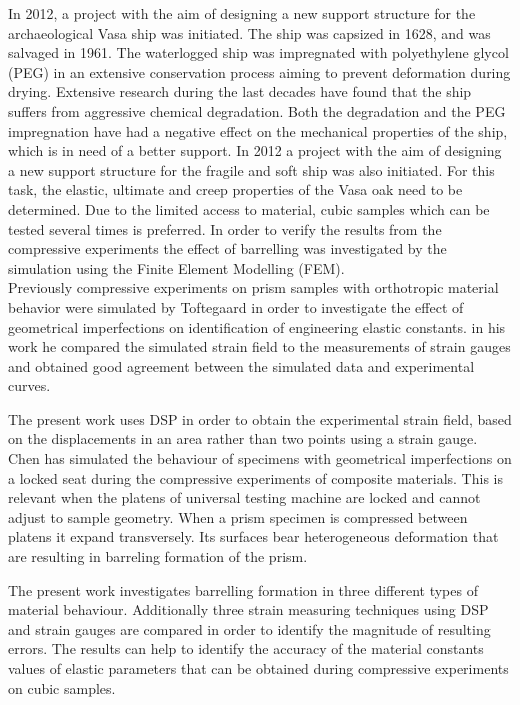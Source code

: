 \documentclass[review]{elsarticle}
\begin{document}
In 2012, a project with the aim of designing a new support structure for the
archaeological Vasa ship was initiated. The ship was capsized in 1628, and was salvaged in 1961. 
The waterlogged ship was impregnated with polyethylene glycol (PEG) in an extensive conservation process aiming to prevent deformation during drying. 
Extensive research during the last decades have found that the ship suffers from
aggressive chemical degradation. Both the degradation \cite{bjurhager2012state}
and the PEG impregnation \cite{ljungdahl2007transverse} have had a negative effect on the mechanical properties of the ship, which is in need of a better support. In 2012 a project with the aim of 
designing a new support structure for the fragile and soft ship was also initiated. For this task, the elastic, ultimate and creep properties of the 
Vasa oak need to be determined. Due to the limited access to material, cubic samples which can be tested several times is preferred.
In order to verify the results from the compressive experiments the effect of
barrelling was investigated by the simulation using the Finite Element
Modelling (FEM).\\
Previously compressive experiments on prism samples with orthotropic material
behavior were simulated by Toftegaard \cite{Toftegaard1999849} in order to
investigate the effect of geometrical imperfections on identification of
engineering elastic constants.
in his work he compared the simulated strain field to the measurements of strain
gauges and obtained good agreement between the simulated data and experimental
curves.\par
The present work uses DSP in order to obtain the experimental strain field,
based on the displacements in an area rather than two points using a strain
gauge.
Chen \cite{Chen001} has simulated the behaviour of specimens with geometrical
imperfections on a locked  seat during the compressive experiments
of composite materials. This is relevant when the platens of universal testing
machine are locked and cannot adjust to sample geometry.
When a prism specimen is compressed between platens it expand transversely.
Its surfaces bear heterogeneous deformation that are resulting in barreling
formation of the prism.\par 




The present work investigates
barrelling formation in three different types of material behaviour.
Additionally three strain measuring techniques using DSP and strain gauges are
compared in order to identify the magnitude of resulting errors.
The results can help to identify the accuracy of the material constants values
of elastic parameters that can be obtained during compressive experiments on
cubic samples.
\end{document}

